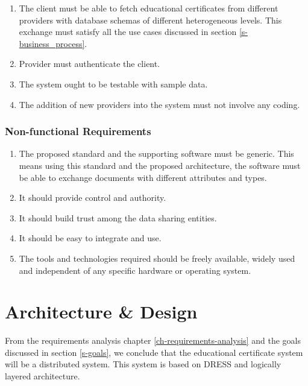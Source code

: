 \documentclass[12pt,a4paper,oneside]{book}
\begin{document}
    \begin{enumerate}

		\item The client must be able to fetch educational certificates from different providers with database schemas of different heterogeneous levels. This exchange must satisfy all the use cases discussed in section \ref{s-business_process}.

		\item Provider must authenticate the client.
	
		\item The system ought to be testable with sample data.	
		
		\item The addition of new providers into the system must not involve any coding.

	\end{enumerate} 

    \subsection{Non-functional Requirements}

	\begin{enumerate}

		\item The proposed standard and the supporting software must be generic. This means using this standard and the proposed architecture, the software must be able to exchange documents with different attributes and types. 

		\item It should provide control and authority.
	
		\item It should build trust among the data sharing entities. 	
		
		\item It should be easy to integrate and use.
		
		\item The tools and technologies required should be freely available, widely used and independent of any specific hardware or operating system.

	\end{enumerate}

\chapter{Architecture \& Design}\label{ch-architecture-design}
From the requirements analysis chapter \ref{ch-requirements-analysis} and the goals discussed in section \ref{s-goals}, we conclude that the educational certificate system will be a distributed system. This system is based on DRESS and logically layered architecture.
\end{document}
